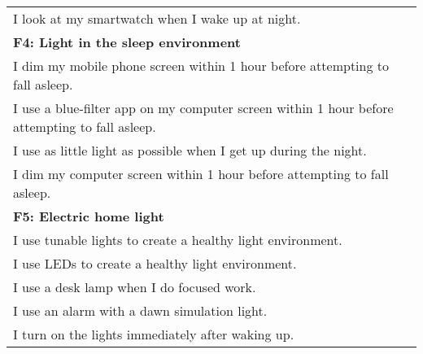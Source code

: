 \documentclass[
  english,
  man,floatsintext]{apa6}
\begin{document}
\begin{longtable}[]{@{}
  >{\raggedright\arraybackslash}p{}@{}}
I look at my smartwatch when I wake up at night. \\
\textbf{F4: Light in the sleep environment} \\
I dim my mobile phone screen within 1 hour before attempting to fall asleep. \\
I use a blue-filter app on my computer screen within 1 hour before attempting to fall asleep. \\
I use as little light as possible when I get up during the night. \\
I dim my computer screen within 1 hour before attempting to fall asleep. \\
\textbf{F5: Electric home light} \\
I use tunable lights to create a healthy light environment. \\
I use LEDs to create a healthy light environment. \\
I use a desk lamp when I do focused work. \\
I use an alarm with a dawn simulation light. \\
I turn on the lights immediately after waking up. \\
\bottomrule
\end{longtable}

\newpage
\end{document}
